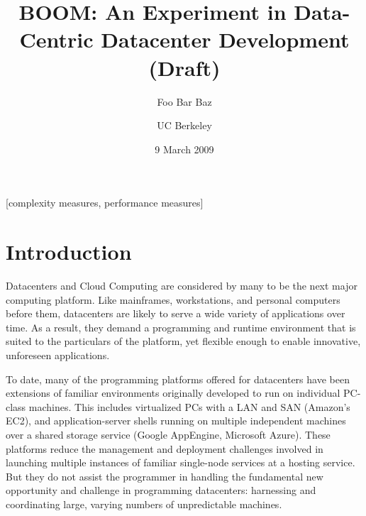 \documentclass{sig-alternate}
\begin{document}

\title{BOOM: An Experiment in Data-Centric Datacenter Development (Draft)}
\author{
\alignauthor
Foo
\alignauthor
Bar
\alignauthor
Baz
\and
UC Berkeley
}
\date{9 March 2009}

\maketitle
\begin{abstract}
\end{abstract}

[complexity measures, performance measures]


\section{Introduction}
Datacenters and Cloud Computing are considered by many to be the next major computing platform.  Like mainframes, workstations, and personal computers before them, datacenters are likely to serve a wide variety of applications over time.  As a result, they demand a programming and runtime environment that is suited to the particulars of the platform, yet flexible enough to enable innovative, unforeseen applications.

To date, many of the programming platforms offered for datacenters have been extensions of familiar environments originally developed to run on individual PC-class machines.  This includes virtualized PCs with a LAN and SAN  (Amazon's EC2), and application-server shells running on multiple independent machines over a shared storage service (Google AppEngine, Microsoft Azure).
These platforms reduce the management and deployment challenges involved in launching multiple instances of familiar single-node services at a hosting service.  But they do not assist the programmer in handling the fundamental new opportunity and challenge in programming datacenters: harnessing and coordinating large, varying numbers of unpredictable machines.  
\end{document}

